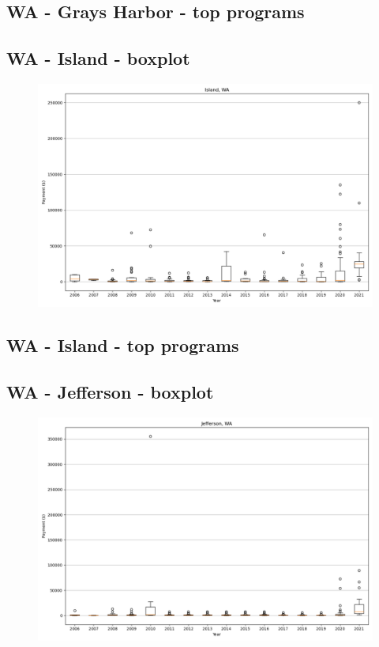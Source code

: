 \subsection*{WA - Grays Harbor - top programs}

\newpage
\subsection*{WA - Island - boxplot}
\begin{figure}[h]
\centering
\includegraphics[width=7in]{../output/boxplots/counties/Island-WA_boxplot.png}
\end{figure}


\subsection*{WA - Island - top programs}

\newpage
\subsection*{WA - Jefferson - boxplot}
\begin{figure}[h]
\centering
\includegraphics[width=7in]{../output/boxplots/counties/Jefferson-WA_boxplot.png}
\end{figure}


